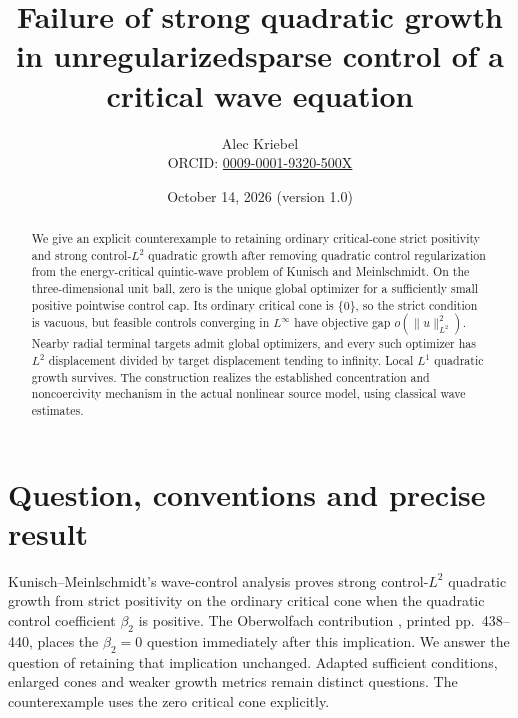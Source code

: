 \documentclass[11pt]{article}
\title{Failure of strong quadratic growth in unregularized\newline sparse control of a critical wave equation}
\author{Alec Kriebel\\\small ORCID: \href{https://orcid.org/0009-0001-9320-500X}{0009-0001-9320-500X}}
\date{October 14, 2026 \quad (version 1.0)}
\newcommand{\norm}[1]{\lVert #1\rVert}
\begin{document}
\maketitle
\begin{abstract}
We give an explicit counterexample to retaining ordinary critical-cone
strict positivity and strong control-$L^2$ quadratic growth after removing
quadratic control regularization from the energy-critical quintic-wave
problem of Kunisch and Meinlschmidt. On the three-dimensional unit ball,
zero is the unique global optimizer for a sufficiently small positive
pointwise control cap. Its ordinary critical cone is $\{0\}$, so the strict
condition is vacuous, but feasible controls converging in $L^\infty$ have
objective gap $o(\norm{u}_{L^2}^2)$. Nearby radial terminal targets admit
global optimizers, and every such optimizer has $L^2$ displacement divided
by target displacement tending to infinity. Local $L^1$ quadratic growth
survives. The construction realizes the established concentration and
noncoercivity mechanism in the actual nonlinear source model, using
classical wave estimates.
\end{abstract}

\section{Question, conventions and precise result}

Kunisch--Meinlschmidt's wave-control analysis \cite[Theorem~4.17]{KM} proves strong
control-$L^2$ quadratic growth from strict positivity on the ordinary
critical cone when the quadratic control coefficient $\beta_2$ is positive.
The Oberwolfach contribution \cite{OWR}, printed pp.~438--440, places the
$\beta_2=0$ question immediately after this implication. We answer the
question of retaining that implication unchanged. Adapted sufficient
conditions, enlarged cones and weaker growth metrics remain distinct
questions. The counterexample uses the zero critical cone explicitly.
\end{document}
